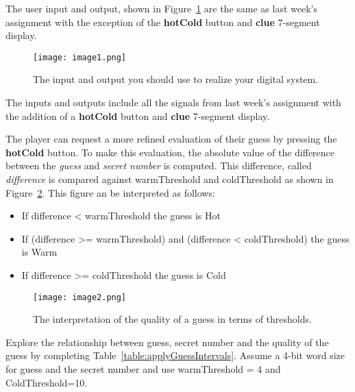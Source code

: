The user input and output, shown in Figure~\ref{fig:iOonDevBorad} are the same as last week's
assignment with the exception of the \textbf{hotCold} button and
\textbf{clue} 7-segment display.

\begin{figure}[ht]
    \texttt{[image:  image1.png]}
    \caption{The input and output you should use to realize your digital system.}
    \label{fig:iOonDevBorad}
\end{figure}

The inputs and outputs include all the signals from last week's assignment
with the addition of a \textbf{hotCold} button and \textbf{clue} 7-segment
display.

The player can request a more refined evaluation of their guess by
pressing the \textbf{hotCold} button. To make this evaluation, the
absolute value of the difference between the \emph{guess} and
\emph{secret number} is computed.  This difference, called
\emph{difference} is compared against warmThreshold
and coldThreshold as shown in Figure~\ref{fig:guessThreshold}.
This figure an be interpreted as follows:

\begin{itemize}
    \item
        If difference \textless{} warmThreshold the guess is Hot
    \item
        If (difference \textgreater= warmThreshold) and (difference
        \textless{} coldThreshold) the guess is Warm
    \item
        If difference \textgreater= coldThreshold the guess is Cold
\end{itemize}

\begin{figure}[ht]
    \texttt{[image:  image2.png]}
    \caption{The interpretation of the quality of a guess in terms of thresholds.}
    \label{fig:guessThreshold}
\end{figure}

Explore the relationship
between guess, secret number and the quality of the guess by completing
Table~\ref{table:applyGuessIntervals}. Assume a 4-bit word size for guess
and the secret number and use warmThreshold = 4 and ColdThreshold=10.

